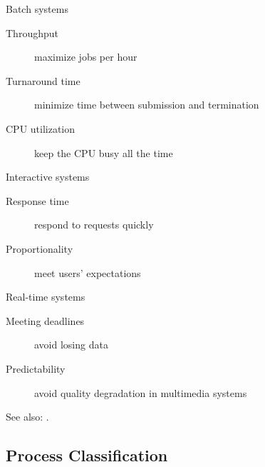 \begin{frame}
  \begin{block}{Batch systems}
    \begin{description}
    \item[Throughput] maximize jobs per hour
    \item[Turnaround time] minimize time between submission and termination
    \item[CPU utilization] keep the CPU busy all the time
    \end{description}
  \end{block}
  \begin{block}{Interactive systems}
    \begin{description}
    \item[Response time] respond to requests quickly
    \item[Proportionality] meet users' expectations
    \end{description}
  \end{block}
  \begin{block}{Real-time systems}
    \begin{description}
    \item[Meeting deadlines] avoid losing data
    \item[Predictability] avoid quality degradation in multimedia systems
    \end{description}
  \end{block}
\end{frame}

See also: .

\subsection{Process Classification}
\label{sec:proc-class}

